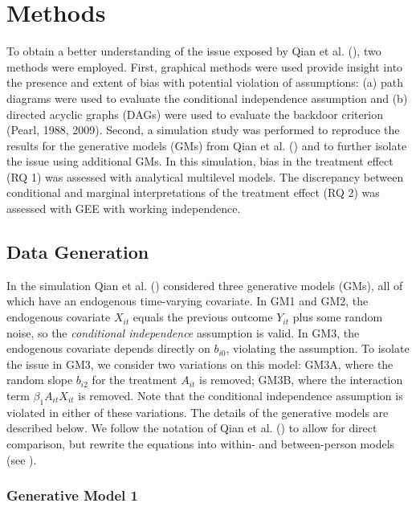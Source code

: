 \documentclass[
  12pt,
  a4paper,
]{article}
\begin{document}
\section{Methods}\label{methods}

To obtain a better understanding of the issue exposed by Qian et al.
(), two methods were employed. First,
graphical methods were used provide insight into the presence and extent
of bias with potential violation of assumptions: (a) path diagrams were
used to evaluate the conditional independence assumption and (b)
directed acyclic graphs (DAGs) were used to evaluate the backdoor
criterion (Pearl, 1988, 2009). Second, a simulation study was performed
to reproduce the results for the generative models (GMs) from Qian et
al. () and to further isolate the issue
using additional GMs. In this simulation, bias in the treatment effect
(RQ 1) was assessed with analytical multilevel models. The discrepancy
between conditional and marginal interpretations of the treatment effect
(RQ 2) was assessed with GEE with working independence.

\subsection{Data Generation}\label{data-generation}

In the simulation Qian et al. () considered
three generative models (GMs), all of which have an endogenous
time-varying covariate. In GM1 and GM2, the endogenous covariate
\(X_{it}\) equals the previous outcome \(Y_{it}\) plus some random
noise, so the \emph{conditional independence} assumption is valid. In
GM3, the endogenous covariate depends directly on \(b_{i0}\), violating
the assumption. To isolate the issue in GM3, we consider two variations
on this model: GM3A, where the random slope \(b_{i2}\) for the treatment
\(A_{it}\) is removed; GM3B, where the interaction term
\(\beta_1 A_{it} X_{it}\) is removed. Note that the conditional
independence assumption is violated in either of these variations. The
details of the generative models are described below. We follow the
notation of Qian et al. () to allow for
direct comparison, but rewrite the equations into within- and
between-person models (see ).

\subsubsection{Generative Model 1}\label{generative-model-1}
\end{document}
